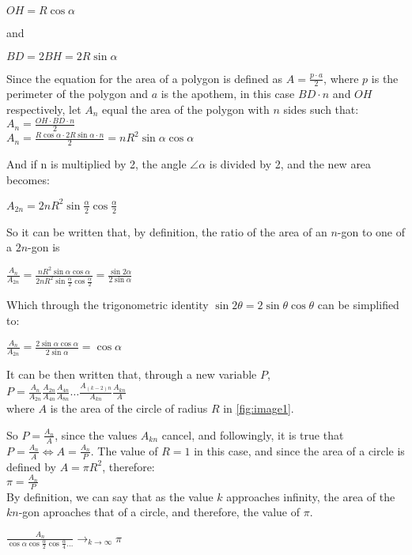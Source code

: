 $OH = R \cos{\alpha}$ 

and

$BD = 2BH = 2 R \sin{\alpha}$

Since the equation for the area of a polygon is defined as $A = \frac{p \cdot a}{2}$, 
where $p$ is the perimeter of the polygon and $a$ is the apothem, in this case $BD \cdot n$ 
and $OH$ respectively, let $A_{n}$ equal the area of 
the polygon with $n$ sides such that: \\
$A_{n} = \frac{OH \cdot BD \cdot n}{2}$ \\
$A_{n} = \frac{R \cos{\alpha} \cdot 2 R \sin{\alpha} \cdot n}{2} = n R^2 \sin{\alpha} \cos{\alpha}$

And if n is multiplied by 2, the angle $\angle \alpha$ is divided by 2, 
and the new area becomes: 

$A_{2n} = 2n R^2 \sin{\frac{\alpha}{2}} \cos{\frac{\alpha}{2}}$

So it can be written that, by definition, the ratio of 
the area of an $n$-gon to one of a $2n$-gon is

$\frac{A_{n}}{A_{2n}} = \frac{n R^2 \sin{\alpha} \cos{\alpha}}{2 n R^2 \sin{\frac{\alpha}{2}} \cos{\frac{\alpha}{2}}} = \frac{\sin{2 \alpha}}{2 \sin{\alpha}}$

Which through the trigonometric identity $\sin{2 \theta} = 2\sin{\theta} \cos{\theta}$ can 
be simplified to:

$\frac{A_{n}}{A_{2n}} = \frac{2\sin{\alpha} \cos{\alpha} }{2\sin{\alpha}}  = \cos{\alpha}$

It can be then written that, through a new variable $P$, \\
$P = \frac{A_{n}}{A_{2n}} \frac{A_{2n}}{A_{4n}} \frac{A_{4n}}{A_{8n}} \dots \frac{A_{(k-2)n}}{A_{kn}} \frac{A_{kn}}{A}$ \\
where $A$ is the area of the circle of radius $R$ 
in \ref{fig:image1}. 

So $P = \frac{A_{n}}{A}$, since the values $A_{kn}$ cancel, and 
followingly, it is true that $P = \frac{A_{n}}{A} \Leftrightarrow A = \frac{A_{n}}{P}$. The 
value of $R = 1$ in this case, and since the area of a circle is defined 
by $A = \pi R^2$, therefore: \\
$\pi = \frac{A_{n}}{P}$ \\
By definition, we can say that as the value $k$ approaches infinity, the area of the $kn$-gon 
aproaches that of a circle, and therefore, the value of $\pi$.

$\frac{A_{n}}{\cos{\alpha} \cos{\frac{\alpha}{2}} \cos{\frac{\alpha}{4}} \dots}
\to_{k \to \infty} \pi$


